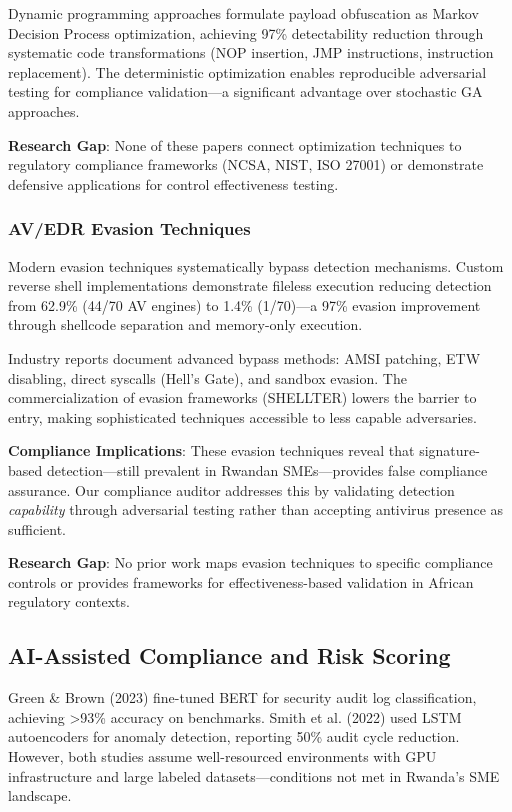 \documentclass[11pt,conference]{IEEEtran}
\begin{document}
Dynamic programming approaches \cite{dp_payload_paper} formulate payload obfuscation as Markov Decision Process optimization, achieving 97\% detectability reduction through systematic code transformations (NOP insertion, JMP instructions, instruction replacement). The deterministic optimization enables reproducible adversarial testing for compliance validation—a significant advantage over stochastic GA approaches.

\textbf{Research Gap}: None of these papers connect optimization techniques to regulatory compliance frameworks (NCSA, NIST, ISO 27001) or demonstrate defensive applications for control effectiveness testing.

\subsubsection{AV/EDR Evasion Techniques}

Modern evasion techniques systematically bypass detection mechanisms. Custom reverse shell implementations \cite{reverse_shell_paper} demonstrate fileless execution reducing detection from 62.9\% (44/70 AV engines) to 1.4\% (1/70)—a 97\% evasion improvement through shellcode separation and memory-only execution.

Industry reports \cite{vaadata2024} document advanced bypass methods: AMSI patching, ETW disabling, direct syscalls (Hell's Gate), and sandbox evasion. The commercialization of evasion frameworks (SHELLTER) \cite{cyberpress2024} lowers the barrier to entry, making sophisticated techniques accessible to less capable adversaries.

\textbf{Compliance Implications}: These evasion techniques reveal that signature-based detection—still prevalent in Rwandan SMEs—provides false compliance assurance. Our compliance auditor addresses this by validating detection \textit{capability} through adversarial testing rather than accepting antivirus presence as sufficient.

\textbf{Research Gap}: No prior work maps evasion techniques to specific compliance controls or provides frameworks for effectiveness-based validation in African regulatory contexts.

\subsection{AI-Assisted Compliance and Risk Scoring}

Green \& Brown (2023) \cite{green2023} fine-tuned BERT for security audit log classification, achieving >93\% accuracy on benchmarks. Smith et al. (2022) \cite{smith2022} used LSTM autoencoders for anomaly detection, reporting 50\% audit cycle reduction. However, both studies assume well-resourced environments with GPU infrastructure and large labeled datasets—conditions not met in Rwanda's SME landscape.
\end{document}
